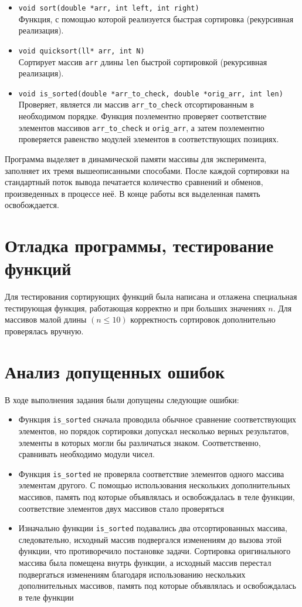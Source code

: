 \documentclass[a4paper,12pt,titlepage,final]{article}
\begin{document}
\begin{itemize}
    Сортирует массив \verb|arr| длины \verb|len| методом «пузырька».
    \item \verb|void sort(double *arr, int left, int right)|\\
    Функция, с помощью которой реализуется быстрая сортировка (рекурсивная реализация).
    \item \verb|void quicksort(ll* arr, int N)|\\
    Сортирует массив \verb|arr| длины \verb|len| быстрой сортировкой (рекурсивная реализация).
    \item \verb|void is_sorted(double *arr_to_check, double *orig_arr, int len)|\\
    Проверяет, является ли массив \verb|arr_to_check| отсортированным в необходимом порядке. Функция поэлементно проверяет соответствие элементов массивов \verb|arr_to_check| и \verb|orig_arr|, а затем поэлементно проверяется равенство модулей элементов в соответствующих позициях.
\end{itemize}
Программа выделяет в динамической памяти массивы для эксперимента, заполняет их тремя вышеописанными способами. После каждой сортировки на стандартный поток вывода печатается количество сравнений и обменов, произведенных в процессе неё. В конце работы вся выделенная память освобождается.
\newpage
\section{Отладка программы, тестирование функций}
Для тестирования сортирующих функций была написана и отлажена специальная тестирующая функция, работающая корректно и при больших значениях $n$. Для массивов малой длины $(n \leq 10)$ корректность сортировок дополнительно проверялась вручную. 

\newpage
\section{Анализ допущенных ошибок}
В ходе выполнения задания были допущены следующие ошибки:
\begin{itemize}
    \item Функция \verb|is_sorted| сначала проводила обычное сравнение соответствующих элементов, но порядок сортировки допускал несколько верных результатов, элементы в которых могли бы различаться знаком. Соответственно, сравнивать необходимо модули чисел.
    \item Функция \verb|is_sorted| не проверяла соответствие элементов одного массива элементам другого. С помощью использования нескольких дополнительных массивов, память под которые объявлялась и освобождалась в теле функции, соответствие элементов двух массивов стало проверяться
    \item Изначально функции \verb|is_sorted| подавались два отсортированных массива, следовательно, исходный массив подвергался изменениям до вызова этой функции, что противоречило постановке задачи. Сортировка оригинального массива была помещена внутрь функции, а исходный массив перестал подвергаться изменениям благодаря использованию нескольких дополнительных массивов, память под которые объявлялась и освобождалась в теле функции
\end{itemize}
\end{document}
